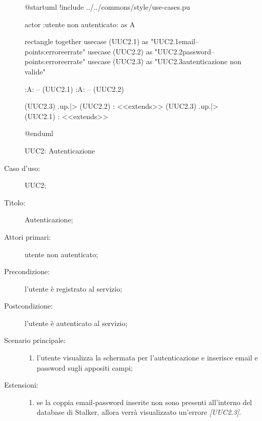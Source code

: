 \documentclass[../../../analisi-dei-requisiti.tex]{subfiles}
\begin{document}
\begin{figure}[H]
  \centering
  \begin{plantuml}
  @startuml
  !include ../../commons/style/use-cases.pu

  actor :utente non autenticato: as A

  rectangle {
    together {
      usecase (UUC2.1) as "UUC2.1\nInserimento email\n--\nExtension points:\nVisualizzazione errore\ncredenziali errate"
      usecase (UUC2.2) as "UUC2.2\nInserimento password\n--\nExtension points:\nVisualizzazione errore\ncredenziali errate"
      usecase (UUC2.3) as "UUC2.3\nInformazioni autenticazione non valide"
    }
  }

  :A: -- (UUC2.1)
  :A: -- (UUC2.2)

  (UUC2.3) .up.|> (UUC2.2) : <<extends>>
  (UUC2.3) .up.|> (UUC2.1) : <<extends>>

  @enduml
  \end{plantuml}
  \caption{UUC2: Autenticazione}%
  \label{fig:uuc2}
\end{figure}

\begin{description}
  \item[Caso d’uso:] UUC2;
  \item[Titolo:] Autenticazione;
  \item[Attori primari:] utente non autenticato;
  \item[Precondizione:] l'utente è registrato al servizio;
  \item[Postcondizione:] l'utente è autenticato al servizio;
  \item[Scenario principale:]
  \begin{enumerate}
    \item l'utente visualizza la schermata per l'autenticazione e inserisce email e password sugli appositi campi;
  \end{enumerate}
  \item[Estensioni:]
  \begin{enumerate}
    \item se la coppia email-password inserite non sono presenti all'interno del database di Stalker, allora verrà visualizzato un'errore \emph{[UUC2.3]}.
  \end{enumerate}
\end{description}
\end{document}
